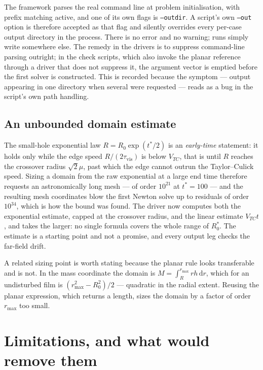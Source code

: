 \documentclass[11pt,a4paper]{article}
\newcommand{\Vtc}{V_{TC}}
\begin{document}
The framework parses the real command line at problem initialisation, with
prefix matching active, and one of its own flags is \texttt{--outdir}. A
script's own \texttt{--out} option is therefore accepted as that flag and
silently overrides every per-case output directory in the process. There is no
error and no warning; runs simply write somewhere else. The remedy in the
drivers is to suppress command-line parsing outright; in the check scripts,
which also invoke the planar reference through a driver that does not suppress
it, the argument vector is emptied before the first solver is constructed.
This is recorded because the symptom --- output appearing in one directory when
several were requested --- reads as a bug in the script's own path handling.

\subsection{An unbounded domain estimate}
\label{sec:trap-domain}

The small-hole exponential law $R = R_{0}\exp(t^{*}/2)$ is an \emph{early-time}
statement: it holds only while the edge speed $R/(2\tau_{\mathrm{vis}})$ is
below $\Vtc$, that is until $R$ reaches the crossover radius $\sqrt{2}\mu$, past
which the edge cannot outrun the Taylor--Culick speed. Sizing a domain from the
raw exponential at a large end time therefore requests an astronomically long
mesh --- of order $10^{21}$ at $t^{*}=100$ --- and the resulting mesh
coordinates blow the first Newton solve up to residuals of order $10^{34}$,
which is how the bound was found. The driver now computes both the exponential
estimate, capped at the crossover radius, and the linear estimate $\Vtc t$, and
takes the larger: no single formula covers the whole range of $R_{0}^{*}$. The
estimate is a starting point and not a promise, and every output leg checks the
far-field drift.

A related sizing point is worth stating because the planar rule looks
transferable and is not. In the mass coordinate the domain is
$M = \int_{R}^{r_{\max}} r h\,\mathrm{d}r$, which for an undisturbed film is
$(r_{\max}^{2}-R_{0}^{2})/2$ --- quadratic in the radial extent. Reusing the
planar expression, which returns a length, sizes the domain by a factor of order
$r_{\max}$ too small.

\section{Limitations, and what would remove them}
\label{sec:limits}
\end{document}
